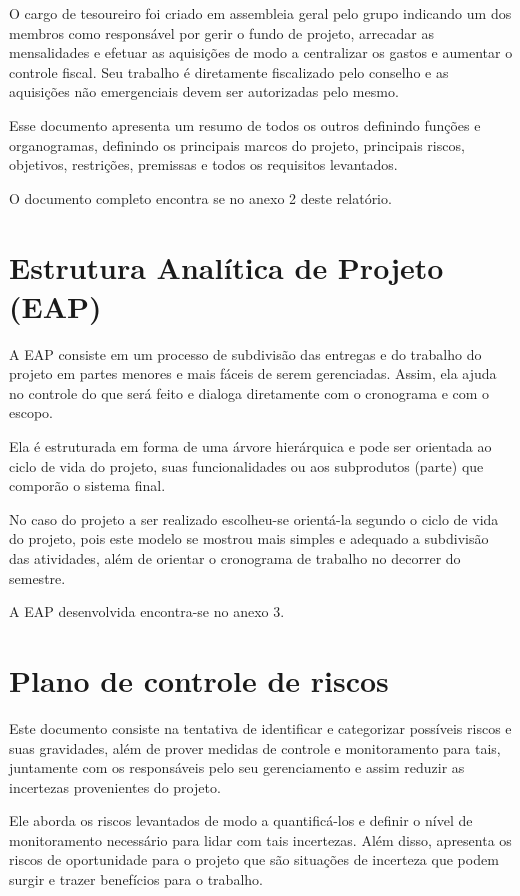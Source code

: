 O cargo de tesoureiro foi criado em assembleia geral pelo grupo indicando um dos membros como responsável por gerir o fundo de projeto, arrecadar as mensalidades e efetuar as aquisições de modo a centralizar os gastos e aumentar o controle fiscal. Seu trabalho é diretamente fiscalizado pelo conselho e as aquisições não emergenciais devem ser autorizadas pelo mesmo.  

Esse documento apresenta um resumo de todos os outros definindo funções e organogramas, definindo os principais marcos do projeto, principais riscos, objetivos, restrições, premissas e todos os requisitos levantados.

O documento completo encontra se no anexo 2 deste relatório.

\section{Estrutura Analítica de Projeto (EAP)}

A EAP consiste em um processo de subdivisão das entregas e do trabalho do projeto em partes menores e mais fáceis de serem gerenciadas. Assim, ela ajuda no controle do que será feito e dialoga diretamente com o cronograma e com o escopo. 

Ela é estruturada em forma de uma árvore hierárquica e pode ser orientada ao ciclo de vida do projeto, suas funcionalidades ou aos subprodutos (parte) que comporão o sistema final.

No caso do projeto a ser realizado escolheu-se orientá-la segundo o ciclo de vida do projeto, pois este modelo se mostrou mais simples e adequado a subdivisão das atividades, além de orientar o cronograma de trabalho no decorrer do semestre.

A EAP desenvolvida encontra-se no anexo 3.

\section{Plano de controle de riscos}

Este documento consiste na tentativa de identificar e categorizar possíveis riscos e suas gravidades, além de prover medidas de controle e monitoramento para tais, juntamente com os responsáveis pelo seu gerenciamento e assim reduzir as incertezas provenientes do projeto.

Ele aborda os riscos levantados de modo a quantificá-los e definir o nível de monitoramento necessário para lidar com tais incertezas. Além disso, apresenta os riscos de oportunidade para o projeto que são situações de incerteza que podem surgir e trazer benefícios para o trabalho.

